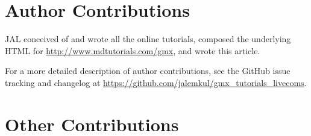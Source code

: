 \documentclass[9pt,tutorial,pubversion]{livecoms}
\newcommand{\githubrepository}{\url{https://github.com/jalemkul/gmx_tutorials_livecoms}}  %
\newcommand{\urlstring}{http://www.mdtutorials.com/gmx}
\newcommand{\tutorialhomeurl}{\url{\urlstring}}
\begin{document}
% 
% 
% 

\section{Author Contributions}
%

JAL conceived of and wrote all the online tutorials, composed the underlying HTML for \tutorialhomeurl, and wrote this article.

For a more detailed description of author contributions,
see the GitHub issue tracking and changelog at \githubrepository.

\section{Other Contributions}
%
\end{document}
